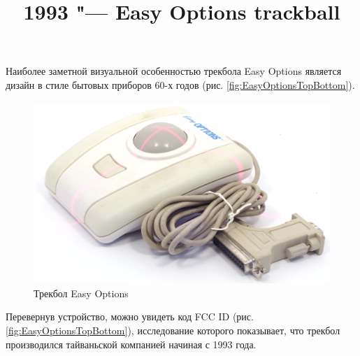 \documentclass[11pt, a4paper]{article}
\begin{document}
\title{1993 "--- Easy Options trackball}
\date{}
\maketitle

Наиболее заметной визуальной особенностью трекбола Easy Options является дизайн в стиле бытовых приборов 60-х годов (рис. \ref{fig:EasyOptionsTopBottom}).

\begin{figure}[h]
    \centering
    \includegraphics[scale=0.5]{1993_easy_options_trackball/pic_60.jpg}
    \caption{Трекбол Easy Options}
    \label{fig:EasyOptionsPic}
\end{figure}

Перевернув устройство, можно увидеть код FCC ID (рис. \ref{fig:EasyOptionsTopBottom}), исследование которого показывает, что трекбол производился тайваньской компанией начиная с 1993 года.
\end{document}
